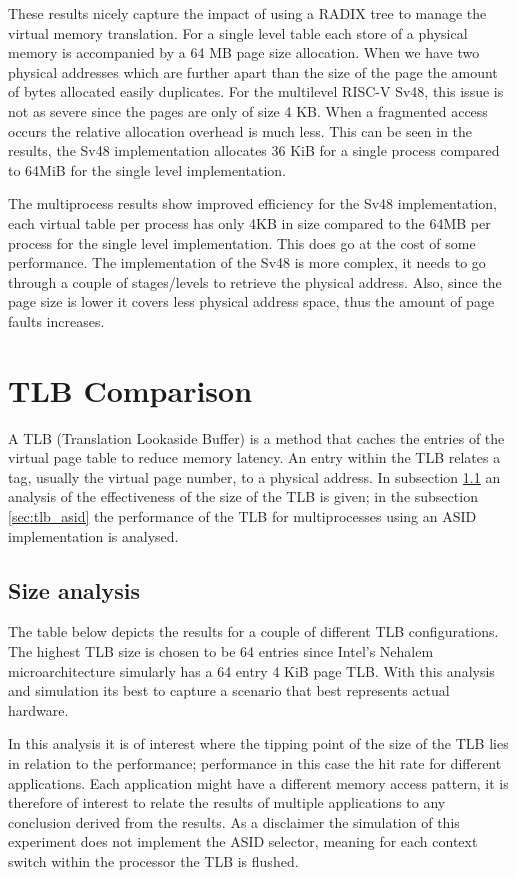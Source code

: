 \documentclass[a4paper,reqno,10pt]{article}
\numberwithin{equation}{subsection}
\theoremstyle{plain}
\theoremstyle{definition}
\begin{document}
These results nicely capture the impact of using a RADIX tree to manage the virtual memory translation. For a single level table each store of a physical memory is accompanied by a 64 MB page size allocation. When we have two physical addresses which are further apart than the size of the page the amount of bytes allocated easily duplicates. For the multilevel RISC-V Sv48, this issue is not as severe since the pages are only of size 4 KB. When a fragmented access occurs the relative allocation overhead is much less. This can be seen in the results, the Sv48 implementation allocates 36 KiB for a single process compared to 64MiB for the single level implementation. 

The multiprocess results show improved efficiency for the Sv48 implementation, each virtual table per process has only 4KB in size compared to the 64MB per process for the single level implementation. This does go at the cost of some performance. The implementation of the Sv48 is more complex, it needs to go through a couple of stages/levels to retrieve the physical address. Also, since the page size is lower it covers less physical address space, thus the amount of page faults increases.

\section{TLB Comparison}
A TLB (Translation Lookaside Buffer) is a method that caches the entries of the virtual page table to reduce memory latency. An entry within the TLB relates a tag, usually the virtual page number, to a physical address. In subsection \ref{sec:tlb_size} an analysis of the effectiveness of the size of the TLB is given; in the subsection \ref{sec:tlb_asid} the performance of the TLB for multiprocesses using an ASID implementation is analysed.

\subsection{Size analysis}
\label{sec:tlb_size}
The table below depicts the results for a couple of different TLB configurations. The highest TLB size is chosen to be 64 entries since Intel's Nehalem microarchitecture simularly has a 64 entry 4 KiB page TLB. With this analysis and simulation its best to capture a scenario that best represents actual hardware.

In this analysis it is of interest where the tipping point of the size of the TLB lies in relation to the performance; performance in this case the hit rate for different applications. Each application might have a different memory access pattern, it is therefore of interest to relate the results of multiple applications to any conclusion derived from the results. As a disclaimer the simulation of this experiment does not implement the ASID selector, meaning for each context switch within the processor the TLB is flushed.
\end{document}
